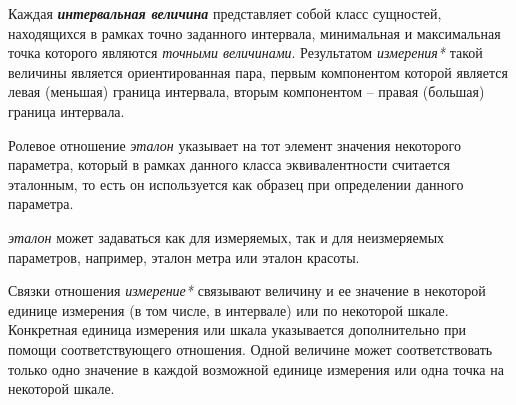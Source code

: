 Каждая \textbf{\textit{интервальная величина}} представляет собой класс сущностей, находящихся в рамках точно заданного интервала, минимальная и максимальная точка которого являются \textit{точными величинами}. Результатом \textit{измерения*} такой величины является ориентированная пара, первым компонентом которой является левая (меньшая) граница интервала, вторым компонентом -- правая (большая) граница интервала.

\begin{SCn}
\end{SCn}

\begin{SCn}
Ролевое отношение \textit{эталон\scnrolesign} указывает на тот элемент значения некоторого параметра, который в рамках данного класса эквивалентности считается эталонным, то есть он используется как образец при определении данного параметра.
\end{SCn}
		
\begin{SCn}
\textit{эталон\scnrolesign} может задаваться как для измеряемых, так и для неизмеряемых параметров, например, эталон метра или эталон красоты.
\end{SCn}
	
\begin{SCn}
\end{SCn}

Связки отношения \textit{измерение*} связывают величину и ее значение в некоторой единице измерения (в том числе, в интервале) или по некоторой шкале. Конкретная единица измерения или шкала указывается дополнительно при помощи соответствующего отношения. Одной величине может соответствовать только одно значение в каждой возможной единице измерения или одна точка на некоторой шкале.
	
